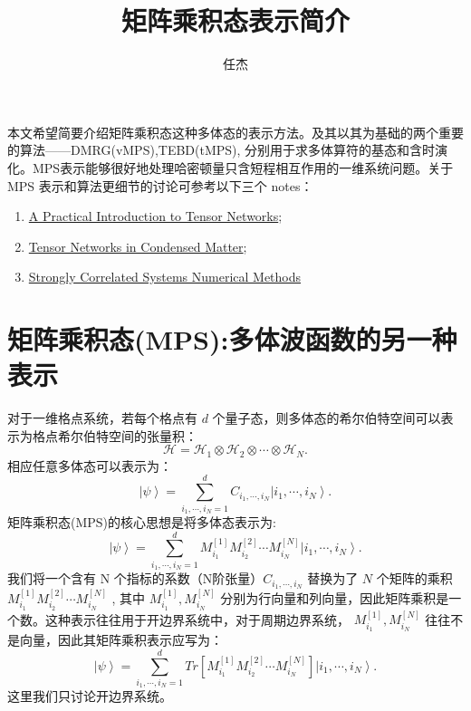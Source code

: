\documentclass[UTF8]{ctexart}
\begin{document}
\title{矩阵乘积态表示简介}
\date{任杰}

\maketitle
\noindent 本文希望简要介绍矩阵乘积态这种多体态的表示方法。及其以其为基础的两个重要的算法——DMRG(vMPS),TEBD(tMPS), 分别用于求多体算符的基态和含时演化。MPS表示能够很好地处理哈密顿量只含短程相互作用的一维系统问题。关于 MPS 表示和算法更细节的讨论可参考以下三个 notes：
\begin{enumerate}
	\item \href{https://arxiv.org/abs/1306.2164}{A Practical Introduction to Tensor Networks};
	\item \href{https://www.researchgate.net/publication/271208696_Tensor_Networks_in_Condensed_Matter}{Tensor Networks in Condensed Matter};
	\item \href{https://link.springer.com/book/10.1007\%2F978-3-642-35106-8}{Strongly Correlated Systems Numerical Methods}
\end{enumerate}
\section*{矩阵乘积态(MPS):多体波函数的另一种表示}
\noindent 对于一维格点系统，若每个格点有 $d$ 个量子态，则多体态的希尔伯特空间可以表示为格点希尔伯特空间的张量积：
\begin{equation}
	\mathscr{H}=\mathscr{H}_{1}\otimes\mathscr{H}_{2}\otimes\cdots\otimes\mathscr{H}_{N}.
\end{equation}
相应任意多体态可以表示为：
\begin{equation}
	\left|\psi\right\rangle =\sum_{i_{1},\cdots,i_{N}=1}^{d}C_{i_{1},\cdots,i_{N}}\left|i_{1},\cdots,i_{N}\right\rangle.
\end{equation}
矩阵乘积态(MPS)的核心思想是将多体态表示为:
\begin{equation}
	\left|\psi\right\rangle =\sum_{i_{1},\cdots,i_{N}=1}^{d}M_{i_{1}}^{\left[1\right]}M_{i_{2}}^{\left[2\right]}\cdots M_{i_{N}}^{\left[N\right]}\left|i_{1},\cdots,i_{N}\right\rangle.
\end{equation}
我们将一个含有 N 个指标的系数（N阶张量）$C_{i_{1},\cdots,i_{N}}$ 替换为了 $N$ 个矩阵的乘积  $M_{i_{1}}^{\left[1\right]}M_{i_{2}}^{\left[2\right]}\cdots M_{i_{N}}^{\left[N\right]}$ , 其中 $M_{i_{1}}^{\left[1\right]},M_{i_{N}}^{\left[N\right]}$ 分别为行向量和列向量，因此矩阵乘积是一个数。这种表示往往用于开边界系统中，对于周期边界系统， $M_{i_{1}}^{\left[1\right]},M_{i_{N}}^{\left[N\right]}$ 往往不是向量，因此其矩阵乘积表示应写为：
\begin{equation}
	\left|\psi\right\rangle =\sum_{i_{1},\cdots,i_{N}=1}^{d}Tr\left[M_{i_{1}}^{\left[1\right]}M_{i_{2}}^{\left[2\right]}\cdots M_{i_{N}}^{\left[N\right]}\right]\left|i_{1},\cdots,i_{N}\right\rangle.
\end{equation}
这里我们只讨论开边界系统。
\end{document}
